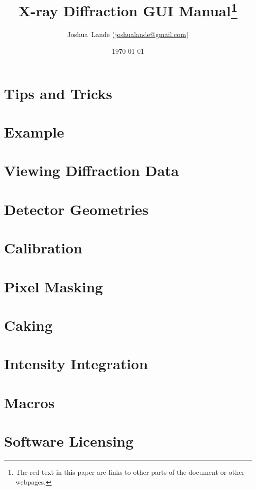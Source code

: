 \documentclass[12pt]{book}
\begin{document}
\title{X-ray Diffraction GUI Manual\footnote{The red text in this paper are links to other parts of the document or other webpages.}}
\date{\today}
\author{Joshua~Lande (\href{mailto:joshualande@gmail.com}{joshualande@gmail.com})}

\setcounter{page}{1}

\maketitle

\tableofcontents

\chapter{Tips and Tricks}


\chapter{Example}


\chapter{Viewing Diffraction Data}\label{viewing_data}


\chapter{Detector Geometries}


\chapter{Calibration}\label{calibration}



\chapter{Pixel Masking}\label{pixel_masking}



\chapter{Caking}\label{Caking}


\chapter{Intensity Integration}


\chapter{Macros}


\chapter{Software Licensing}



 

\printindex
\end{document}
